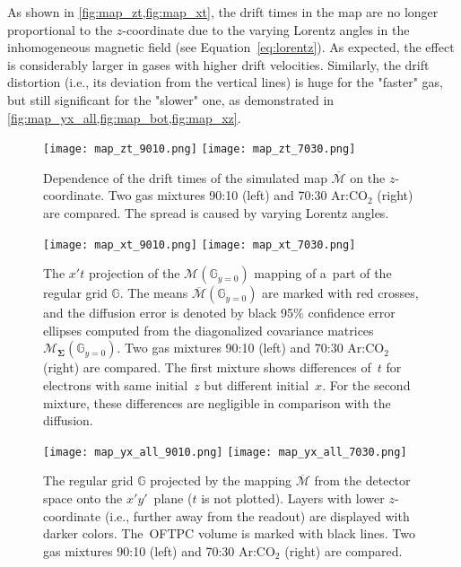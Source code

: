 		As shown in \cref{fig:map_zt,fig:map_xt}, the drift times in the map are no longer proportional to the $z$\nobreakdash-coordinate due to the varying Lorentz angles in the inhomogeneous magnetic field (see Equation~\ref{eq:lorentz}). As expected, the effect is considerably larger in gases with higher drift velocities. Similarly, the drift distortion (i.e., its deviation from the vertical lines) is huge for the "faster" gas, but still significant for the "slower" one, as demonstrated in \cref{fig:map_yx_all,fig:map_bot,fig:map_xz}.
		
		\begin{figure}
			\centering
			\texttt{[image: map\_zt\_9010.png]}
			\hfill
			\texttt{[image: map\_zt\_7030.png]}
			\caption{Dependence of the drift times of the simulated map $\overline{\mathcal{M}}$ on the $z$\protect\nobreakdash-coordinate. Two gas mixtures 90:10 (left) and 70:30 Ar:CO$_2$ (right) are compared. The spread is caused by varying Lorentz angles.}
			\label{fig:map_zt}
		\end{figure}
		
		\begin{figure}
			\centering
			\texttt{[image: map\_xt\_9010.png]}
			\hfill
			\texttt{[image: map\_xt\_7030.png]}
			\caption{The $x't$ projection of the $\mathcal{M}(\mathbb{G}_{y=0})$ mapping of a~part of the regular grid $\mathbb{G}$. The means $\overline{\mathcal{M}}(\mathbb{G}_{y=0})$ are marked with red crosses, and the diffusion error is denoted by black 95\% confidence error ellipses computed from the diagonalized covariance matrices $\mathcal{M}_{\mathbf{\Sigma}}(\mathbb{G}_{y=0})$. Two gas mixtures 90:10 (left) and 70:30 Ar:CO$_2$ (right) are compared. The first mixture shows differences of~$t$ for electrons with same initial~$z$ but different initial~$x$. For the second mixture, these differences are negligible in comparison with the diffusion.}
			\label{fig:map_xt}
		\end{figure}
		
		\begin{figure}
			\centering
			\texttt{[image: map\_yx\_all\_9010.png]}
			\hfill
			\texttt{[image: map\_yx\_all\_7030.png]}
			\caption{The regular grid $\mathbb{G}$ projected by the mapping $\overline{\mathcal{M}}$ from the detector space onto the $x'y'$~plane ($t$ is not plotted). Layers with lower $z$\protect\nobreakdash-coordinate (i.e., further away from the readout) are displayed with darker colors. The~\ac{OFTPC} volume is marked with black lines. Two gas mixtures 90:10 (left) and 70:30 Ar:CO$_2$ (right) are compared.}
			\label{fig:map_yx_all}
		\end{figure}
		
